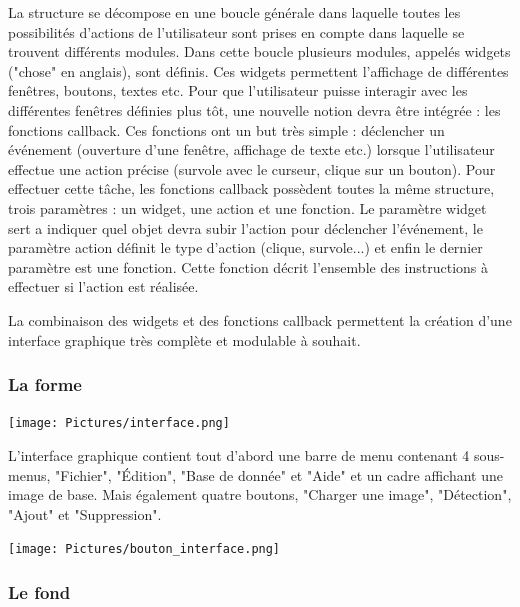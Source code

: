 \documentclass[12pt,a4paper]{article}
\begin{document}
La structure se décompose en une boucle générale dans laquelle toutes les possibilités d'actions de l'utilisateur sont prises en compte dans laquelle se trouvent différents modules. Dans cette boucle plusieurs modules, appelés widgets ("chose" en anglais), sont définis. Ces widgets permettent l'affichage de différentes fenêtres, boutons, textes etc.
Pour que l'utilisateur puisse interagir avec les différentes fenêtres définies plus tôt, une nouvelle notion devra être intégrée : les fonctions callback. Ces fonctions ont un but très simple : déclencher un événement (ouverture d'une fenêtre, affichage de texte etc.) lorsque l'utilisateur effectue une action précise (survole avec le curseur, clique sur un bouton). Pour effectuer cette tâche, les fonctions callback possèdent toutes la même structure, trois paramètres : un widget, une action et une fonction. Le paramètre widget sert a indiquer quel objet devra subir l'action pour déclencher l'événement, le paramètre action définit le type d'action (clique, survole...) et enfin le dernier paramètre est une fonction. Cette fonction décrit l'ensemble des instructions à effectuer si l'action est réalisée.

La combinaison des widgets et des fonctions callback permettent la création d'une interface graphique très complète et modulable à souhait.

\subsubsection{La forme}

\texttt{[image: Pictures/interface.png]} 

L'interface graphique contient tout d'abord une barre de menu contenant 4 sous-menus, "Fichier", "Édition", "Base de donnée" et "Aide" et un cadre affichant une image de base. Mais également quatre boutons, "Charger une image", "Détection", "Ajout" et "Suppression". 
\newline

\begin{center}
\texttt{[image: Pictures/bouton\_interface.png]} 
\end{center}

\subsubsection{Le fond}
\end{document}
